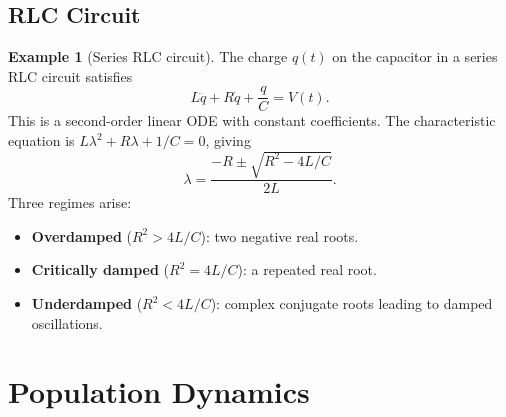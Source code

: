\documentclass[12pt,a4paper,openany]{book}
\theoremstyle{definition}
\newtheorem{example}[definition]{Example}
\theoremstyle{plain}
\theoremstyle{remark}
\begin{document}
\subsection{RLC Circuit}
\label{subsec:RLC}

\begin{example}[Series RLC circuit]
\label{ex:RLC-circuit}
The charge $q(t)$ on the capacitor in a series RLC circuit satisfies
\begin{equation}\label{eq:RLC}
  L\ddot{q} + R\dot{q} + \frac{q}{C} = V(t).
\end{equation}
This is a second-order linear ODE with constant coefficients. The
characteristic equation is $L\lambda^{2}+R\lambda+1/C=0$, giving
\[
  \lambda = \frac{-R\pm\sqrt{R^{2}-4L/C}}{2L}.
\]
Three regimes arise:
\begin{itemize}
  \item \textbf{Overdamped} ($R^{2}>4L/C$): two negative real roots.
  \item \textbf{Critically damped} ($R^{2}=4L/C$): a repeated real
    root.
  \item \textbf{Underdamped} ($R^{2}<4L/C$): complex conjugate roots
    leading to damped oscillations.
\end{itemize}
\end{example}

\begin{center}
\end{center}

\section{Population Dynamics}
\label{sec:population-dynamics}
\end{document}
